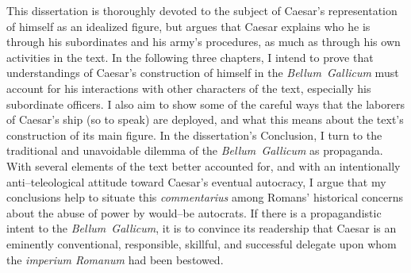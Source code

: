 \documentclass[12pt,letterpaper,oneside,final]{memoir}
\begin{document}
This dissertation is thoroughly devoted to the subject of Caesar's representation of himself as an idealized figure, but argues that Caesar explains who he is through his subordinates and his army's procedures, as much as through his own activities in the text. In the following three chapters, I intend to prove that understandings of Caesar's construction of himself in the \emph{Bellum~Gallicum} must account for his interactions with other characters of the text, especially his subordinate officers. I also aim to show some of the careful ways that the laborers of Caesar's ship (so to speak) are deployed, and what this means about the text's construction of its main figure. In the dissertation's Conclusion, I turn to the traditional and unavoidable dilemma of the \emph{Bellum~Gallicum} as propaganda. With several elements of the text better accounted for, and with an intentionally anti--teleological attitude toward Caesar's eventual autocracy, I argue that my conclusions help to situate this \emph{commentarius} among Romans' historical concerns about the abuse of power by would--be autocrats. If there is a propagandistic intent to the \emph{Bellum~Gallicum}, it is to convince its readership that Caesar is an eminently conventional, responsible, skillful, and successful delegate upon whom the \emph{imperium Romanum} had been bestowed.
\end{document}
